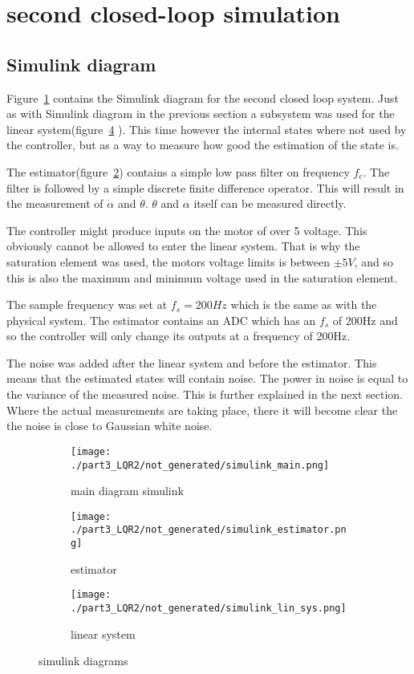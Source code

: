 \section{second closed-loop simulation}

\subsection{Simulink diagram}
	Figure~\ref{fig: simulink diagram main} contains the Simulink diagram for the second closed loop system. Just as with Simulink diagram in the previous section a subsystem was used for the linear system(figure~\ref{fig: simulink diagram lin system LQR2} ). This time however the internal states where not used by the controller, but as a way to measure how good the estimation of the state is. 
	
	The estimator(figure~\ref{fig: simulink estimator}) contains a simple low pass filter on frequency $f_c$. The filter is followed by a simple discrete finite difference operator. This will result in the measurement of $\dot{\alpha}$ and $\dot{\theta}$. $\theta$ and $\alpha$ itself can be measured directly.
	
	The controller might produce inputs on the motor of over 5 voltage. This obviously cannot be allowed to enter the linear system. That is why the saturation element was used, the motors voltage limits is between $\pm 5V$, and so this is also the maximum and minimum voltage used in the saturation element.
	
	The sample frequency was set at $f_s=200Hz$ which is the same as with the physical system. The estimator contains an ADC which has an $f_s$ of 200Hz and so the controller will only change its outputs at a frequency of 200Hz.
	
	The noise was added after the linear system and before the estimator. This means that the estimated states will contain noise. The power in noise is equal to the variance of the measured noise. This is further explained in the next section. Where the actual measurements are taking place, there it will become clear the the noise is close to Gaussian white noise.

	\begin{figure}[H]
		\centering
		\begin{subfigure}[b]{0.7\textwidth}
			\texttt{[image: ./part3\_LQR2/not\_generated/simulink\_main.png]}
			\caption{main diagram simulink}
			\label{fig: simulink diagram main}
		\end{subfigure}
		\begin{subfigure}[b]{0.45\textwidth}
			\texttt{[image: ./part3\_LQR2/not\_generated/simulink\_estimator.png]}
			\caption{estimator}
			\label{fig: simulink estimator}
		\end{subfigure}
		\begin{subfigure}[b]{0.45\textwidth}
			\texttt{[image: ./part3\_LQR2/not\_generated/simulink\_lin\_sys.png]}
			\caption{linear system}
			\label{fig: simulink diagram lin system LQR2}
		\end{subfigure}
		\caption{simulink diagrams}
	\end{figure}

